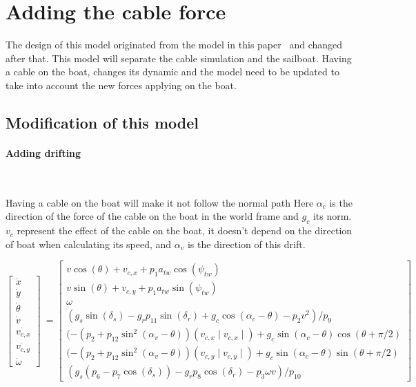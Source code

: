 \section{Adding the cable force}

The design of this model originated from the model in this paper~\cite{Jaulin2015} and changed after that.
This model will separate the cable simulation and the sailboat. Having a cable on the boat, changes its dynamic 
and the model need to be updated to take into account the new forces applying on the boat.
\subsection{Modification of this model}
\paragraph*{Adding drifting}
~\\
\hskip7mm 

Having a cable on the boat will make it not follow the normal path 
Here $\alpha_{c}$ is the direction of the force of the cable on the boat in the world frame and $g_c$ its norm.
$v_c$ represent the effect of the cable on the boat, it doesn't depend on the direction of boat when calculating its speed, and $\alpha_{v}$ is the direction of this drift. 


\begin{equation}
\begin{bmatrix}
\dot{x}\\
\dot{y}\\
\dot{\theta}\\
\dot{v}\\
\dot{v_{c,x}}\\
\dot{v_{c,y}}\\
\dot{\omega}
\end{bmatrix}\  = \begin{bmatrix}
v \cos(\theta)+v_{c,x}+p_1 a_{tw} \cos(\psi_{tw})\\
v \sin(\theta)+v_{c,y}+p_1 a_{tw} \sin(\psi_{tw})\\
\omega\\
(g_s \sin(\delta_s)-g_r p_{11} \sin(\delta_r)+ g_c \cos(\alpha_c-\theta) - p_2 v^2)/p_9\\
(-(p_2+p_{12} \sin^2(\alpha_v-\theta))(v_{c,x} \mid v_{c,x} \mid ) + g_c \sin(\alpha_{c} -\theta) \cos(\theta+\pi/2)\\
(-(p_2+p_{12} \sin^2(\alpha_v-\theta))(v_{c,y} \mid v_{c,y} \mid ) + g_c \sin(\alpha_{c} -\theta) \sin(\theta+\pi/2)\\
(g_s(p_6-p_7\cos(\delta_s))-g_r p_8 \cos(\delta_r)-p_3 \omega v)/p_{10}
\end{bmatrix}
\end{equation}

